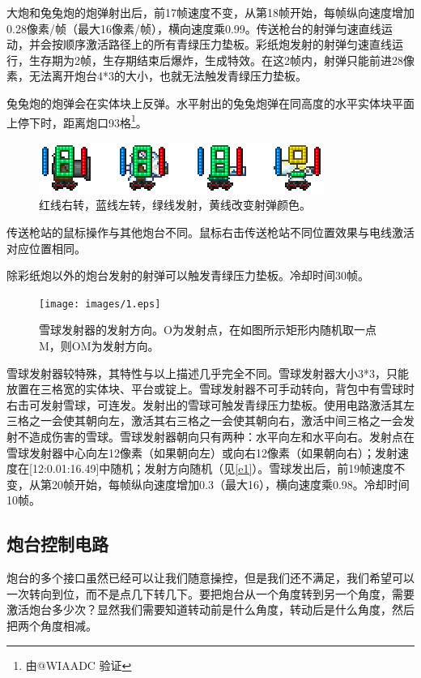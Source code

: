 大炮和兔兔炮的炮弹射出后，前17帧速度不变，从第18帧开始，每帧纵向速度增加0.28像素/帧（最大16像素/帧），横向速度乘0.99。传送枪台的射弹匀速直线运动，并会按顺序激活路径上的所有青绿压力垫板。彩纸炮发射的射弹匀速直线运行，生存期为2帧，生存期结束后爆炸，生成特效。在这2帧内，射弹只能前进28像素，无法离开炮台4*3的大小，也就无法触发青绿压力垫板。

兔兔炮的炮弹会在实体块上反弹。水平射出的兔兔炮弹在同高度的水平实体块平面上停下时，距离炮口93格\footnote{由@WIAADC 验证}。

\begin{figure}[!ht]
\centering
\includegraphics{images/215.png}
\caption{红线右转，蓝线左转，绿线发射，黄线改变射弹颜色。}
\label{i215}
\end{figure}

传送枪站的鼠标操作与其他炮台不同。鼠标右击传送枪站不同位置效果与电线激活对应位置相同。

除彩纸炮以外的炮台发射的射弹可以触发青绿压力垫板。冷却时间30帧。

\begin{figure}[!ht]
\centering
\texttt{[image: images/1.eps]}
\caption{雪球发射器的发射方向。O为发射点，在如图所示矩形内随机取一点M，则OM为发射方向。}\label{e1}
\end{figure}
雪球发射器较特殊，其特性与以上描述几乎完全不同。雪球发射器大小3*3，只能放置在三格宽的实体块、平台或锭上。雪球发射器不可手动转向，背包中有雪球时右击可发射雪球，可连发。发射出的雪球可触发青绿压力垫板。使用电路激活其左三格之一会使其朝向左，激活其右三格之一会使其朝向右，激活中间三格之一会发射不造成伤害的雪球。雪球发射器朝向只有两种：水平向左和水平向右。发射点在雪球发射器中心向左12像素（如果朝向左）或向右12像素（如果朝向右）；发射速度在[12:0.01:16.49]中随机；发射方向随机（见\autoref{e1}）。雪球发出后，前19帧速度不变，从第20帧开始，每帧纵向速度增加0.3（最大16），横向速度乘0.98。冷却时间10帧。

\subsection{炮台控制电路}
炮台的多个接口虽然已经可以让我们随意操控，但是我们还不满足，我们希望可以一次转向到位，而不是点几下转几下。要把炮台从一个角度转到另一个角度，需要激活炮台多少次？显然我们需要知道转动前是什么角度，转动后是什么角度，然后把两个角度相减。

